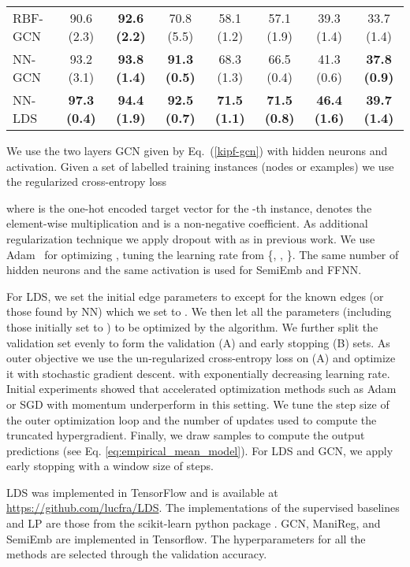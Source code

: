 \documentclass{article}
\newcommand{\lds}{\textsc{LDS}\xspace}
\begin{document}
\begin{table*}[t]
\begin{center}
\begin{small}
\begin{tabular}{lccccccc}
RBF-GCN    & 90.6 (2.3) & \textbf{92.6 (2.2)}  & 70.8 (5.5) & 58.1 (1.2)   & 57.1 (1.9)   &  39.3 (1.4)  & 33.7 (1.4)   \\
NN-GCN    & 93.2 (3.1) & \textbf{93.8 (1.4)}  & \textbf{91.3 (0.5)} & 68.3 (1.3)   & 66.5 (0.4)   &  41.3 (0.6)  & \textbf{37.8 (0.9)}   \\
\midrule
NN-\lds     & \textbf{97.3 (0.4)} & \textbf{94.4 (1.9)}  & \textbf{92.5 (0.7)} & \textbf{71.5 (1.1)}   & \textbf{71.5 (0.8)}   & \textbf{46.4 (1.6)}   & \textbf{39.7 (1.4)}  \\
\bottomrule
\end{tabular}
\end{small}
\end{center}
\vspace{-4mm}
\end{table*}


We use the two layers GCN given by Eq.~(\ref{kipf-gcn}) with  hidden neurons and  activation. Given a set of labelled training instances  (nodes or examples) we use the regularized cross-entropy loss

where  is the one-hot encoded target vector for the -th instance,  denotes the element-wise multiplication and  is a non-negative coefficient. As additional regularization technique we apply dropout \citep{srivastava2014dropout} with  as in previous work. We use Adam~\citep{kingma2014adam} for optimizing , tuning the learning rate  from \{, , \}. 
The same number of hidden neurons and the same activation is used for SemiEmb and FFNN. 

For \lds, we set the initial edge parameters  to  except for the known  edges (or those found by NN) which we set to . We then let all the parameters (including those initially set to ) to be optimized by the algorithm.
We further split the validation set evenly to form the validation (A) and early stopping (B) sets. As outer objective we use the un-regularized cross-entropy loss on (A) and  optimize it with stochastic gradient descent.
with exponentially decreasing learning rate. Initial experiments showed that accelerated optimization methods such as Adam or SGD with momentum underperform in this setting. We tune the step size  of the outer optimization loop and the number of updates  used to compute the truncated hypergradient. Finally, we draw  samples to compute the output predictions (see Eq. \eqref{eq:empirical_mean_model}). For \lds and GCN, we apply early stopping with a window size of  steps.


\lds was implemented in TensorFlow \citep{tensorflow2015-whitepaper} and is available at \url{https://github.com/lucfra/LDS}. The implementations of  the supervised baselines and LP are those from the scikit-learn python package \citep{scikit-learn}. GCN, ManiReg, and SemiEmb are implemented in Tensorflow. The hyperparameters for all the methods are selected through the validation accuracy. 
\end{document}
